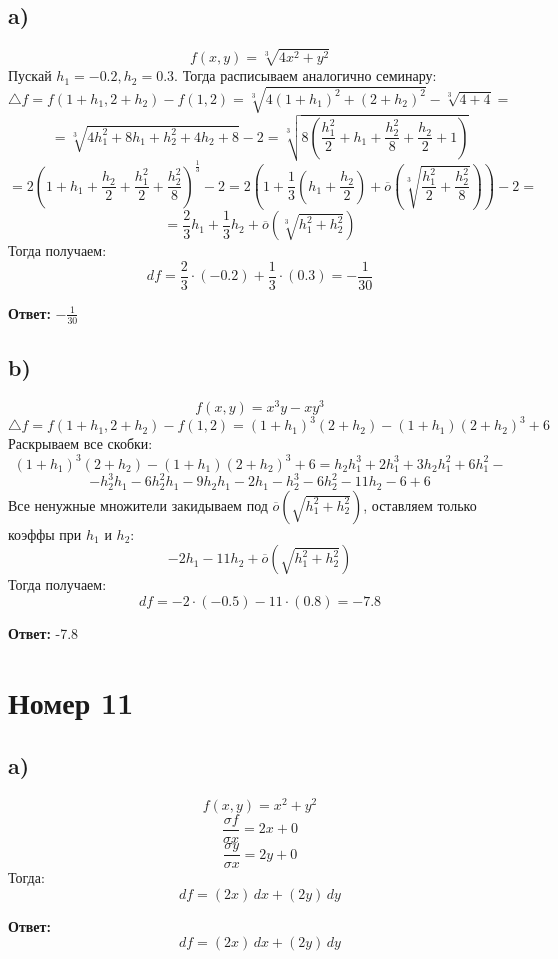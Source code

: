 \documentclass[a4paper,12pt]{article}
\begin{document}
\subsection*{a)}
\[
f(x, y) = \sqrt[3]{4x^2 + y^2}
\]
Пускай $h_1 = -0.2, h_2 = 0.3$. Тогда расписываем аналогично семинару:
\[
\triangle f = f(1 + h_1, 2 + h_2) - f(1, 2) = \sqrt[3]{4(1+h_1)^2 + (2+h_2)^2} - \sqrt[3]{4 + 4} =
\]
\[
=
 \sqrt[3]{4 h_1^2 + 8 h_1 + h_2^2 + 4 h_2 + 8} - 2 = \sqrt[3]{8\left(\frac{h_1^2}{2} + h_1 + \frac{h_2^2}{8} + \frac{h_2}{2} + 1 \right)}
\]
\[
=
2\left(1 + h_1 + \frac{h_2}{2} + \frac{h_1^2}{2} + \frac{h_2^2}{8} \right)^{\frac{1}{3}} - 2 = 2 \left(1 + \frac{1}{3}\left(h_1 + \frac{h_2}{2} \right) +  \overline{o}(\sqrt[3]{\frac{h_1^2}{2} + \frac{h_2^2}{8}})  \right) - 2 = 
\]
\[
= \frac{2}{3}h_1 + \frac{1}{3}h_2 +  \overline{o}\left(\sqrt[3]{h_1^2+ h_2^2}\right)
\]
Тогда получаем:
\[
df = \frac{2}{3} \cdot (-0.2) + \frac{1}{3} \cdot (0.3) = -\frac{1}{30}
\]
{\Large \begin{center}
\textbf{Ответ: } $- \frac{1}{30}$
\end{center}}
\clearpage
\subsection*{b)}
\[
f(x, y) = x^3 y - xy^3
\]
\[
\triangle f = f(1 + h_1, 2 + h_2) - f(1, 2) = (1+h_1)^3(2+h_2) - (1+h_1)(2+h_2)^3 + 6
\]
Раскрываем все скобки:
\[
(1+h_1)^3(2+h_2) - (1+h_1)(2+h_2)^3 + 6 = h_2 h_1^3 + 2 h_1^3 + 3 h_2 h_1^2 + 6 h_1^2 -
\]
\[
-
 h_2^3 h_1 - 6 h_2^2 h_1 - 9 h_2 h_1 - 2 h_1 - h_2^3 - 6 h_2^2 - 11 h_2 - 6 + 6
\]
Все ненужные множители закидываем под $ \overline{o}\left(\sqrt{h_1^2+ h_2^2}\right)$, оставляем только коэффы при $h_1$ и $h_2$:
\[
-2h_1 - 11h_2 + \overline{o}\left(\sqrt{h_1^2+ h_2^2}\right)
\]
Тогда получаем:
\[
df = -2 \cdot (-0.5) - 11 \cdot (0.8) = -7.8
\]
{\Large \begin{center}
\textbf{Ответ: } -7.8 
\end{center}}
\clearpage
\section*{Номер 11}
\subsection*{a)}
\[
f(x, y) = x^2 + y^2
\]
\[
\frac{\sigma f}{\sigma x} =  2x + 0
\]
\[
\frac{\sigma y}{\sigma x} = 2y + 0
\]
Тогда:
\[
df = (2x) \,dx + (2y) \,dy 
\]
{\Large \begin{center}
\textbf{Ответ: } 
\[
df = (2x) \,dx + (2y) \,dy 
\]
\end{center}}
\end{document}
